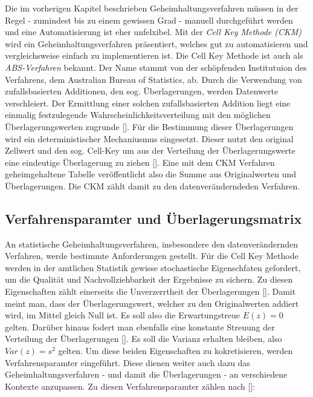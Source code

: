 Die im vorherigen Kapitel beschrieben Geheimhaltungsverfahren müssen in der Regel - zumindest bis zu einem gewissen Grad - manuell durchgeführt werden und eine Automatisierung ist eher unfelxibel. Mit der \textit{Cell Key Methode (CKM)} wird ein Geheimhaltungsverfahren präsentiert, welches gut zu automatisieren und vergleichsweise einfach zu implementieren ist. Die Cell Key Methode ist auch als \textit{ABS-Verfahren} bekannt. Der Name stammt von der schöpfenden Institutuion des Verfahrens, dem Australian Bureau of Statistics, ab. Durch die Verwendung von zufallsbasierten Additionen, den sog. Überlagerungen, werden Datenwerte verschleiert. Der Ermittlung einer solchen zufallsbasierten Addition liegt eine einmalig festzulegende Wahrscheinlichkeitsverteilung mit den möglichen Überlagerungswerten zugrunde [\cite{Enderle}]. Für die Bestimmung dieser Überlagerungen wird ein deterministischer Mechaniusmus eingesetzt. Dieser nutzt den original Zellwert und den sog. Cell-Key um aus der Verteilung der Überlagerungswerte eine eindeutige Überlagerung zu ziehen [\cite{Enderle}]. Eine mit dem CKM Verfahren geheimgehaltene Tabelle veröffentlicht also die Summe aus Originalwerten und Überlagerungen. Die CKM zählt damit zu den datenveränderndeden Verfahren.

\subsection{Verfahrensparamter und Überlagerungsmatrix}

An statistische Geheimhaltungsverfahren, insbesondere den datenverändernden Verfahren, werde bestimmte Anforderungen gestellt. Für die Cell Key Methode werden in der amtlichen Statistik gewisse stochastische Eigenschfaten gefordert, um die Qualität und Nachvollziehbarkeit der Ergebnisse zu sichern. Zu diesen Eigenschaften zählt einerseits die Unverzerrtheit der Überlagerungen [\cite{Enderle}]. Damit meint man, dass der Überlagerungswert, welcher zu den Originalwerten addiert wird, im Mittel gleich Null ist. Es soll also die Erwartungstreue $E(z) = 0$ gelten. Darüber hinaus fodert man ebenfalls eine konstante Streuung der Verteilung der Überlagerungen [\cite{Enderle}]. Es soll die Varianz erhalten bleiben, also $Var(z) = s^2$ gelten. Um diese beiden Eigenschaften zu kokretisieren, werden Verfahrensparamter eingeführt. Diese dienen weiter auch dazu das Geheimhaltungsverfahren - und damit die Überlagerungen - an verschiedene Kontexte anzupassen. Zu diesen Verfahrensparamter zählen nach [\cite{Höhne}]:

